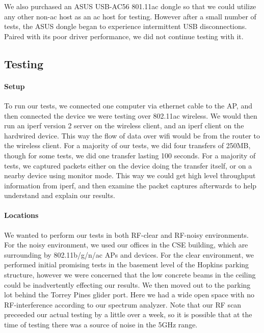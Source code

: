 We also purchased an ASUS USB-AC56 801.11ac dongle so that we could
utilize any other non-ac host as an ac host for testing. However after
a small number of tests, the ASUS dongle began to experience
intermittent USB disconnections. Paired with its poor driver
performance, we did not continue testing with it.

\subsection{Testing}

\paragraph{Setup}
To run our tests, we connected one computer via ethernet cable to the AP, and
then connected the device we were testing over 802.11ac wireless. We would then
run an iperf version 2 server on the wireless client, and
an iperf client on the hardwired device. This way the flow of data over wifi
would be from the router to the wireless client. For a majority of our tests, we
did four transfers of 250MB, though for some tests, we did one transfer lasting
100 seconds. For a majority of tests, we captured packets either on the device
doing the transfer itself, or on a nearby device using monitor mode. This way
we could get high level throughput information from iperf, and then examine the
packet captures afterwards to help understand and explain our results.

\paragraph{Locations}
We wanted to perform our tests in both RF-clear and RF-noisy
environments. For the noisy environment, we used our offices in the
CSE building, which are surrounding by 802.11b/g/n/ac APs and
devices. For the clear environment, we performed initial promising
tests in the basement level of the Hopkins parking structure, however
we were concerned that the low concrete beams in the ceiling could be
inadvertently effecting our results. We then moved out to the parking
lot behind the Torrey Pines glider port. Here we had a wide open space
with no RF-interference according to our spectrum analyzer. Note that
our RF scan preceeded our actual testing by a little over a week, so
it is possible that at the time of testing there was a source of noise
in the 5GHz range.


